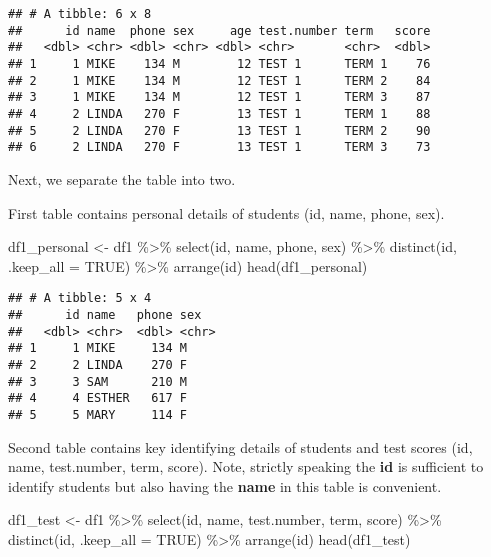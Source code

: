 \documentclass[
]{article}
\newenvironment{Shaded}{\begin{snugshade}}{\end{snugshade}}
\newcommand{\AttributeTok}[1]{\textcolor[rgb]{0.77,0.63,0.00}{#1}}
\newcommand{\ConstantTok}[1]{\textcolor[rgb]{0.00,0.00,0.00}{#1}}
\newcommand{\FunctionTok}[1]{\textcolor[rgb]{0.00,0.00,0.00}{#1}}
\newcommand{\NormalTok}[1]{#1}
\newcommand{\OtherTok}[1]{\textcolor[rgb]{0.56,0.35,0.01}{#1}}
\newcommand{\SpecialCharTok}[1]{\textcolor[rgb]{0.00,0.00,0.00}{#1}}
\begin{document}
\begin{verbatim}
## # A tibble: 6 x 8
##      id name  phone sex     age test.number term   score
##   <dbl> <chr> <dbl> <chr> <dbl> <chr>       <chr>  <dbl>
## 1     1 MIKE    134 M        12 TEST 1      TERM 1    76
## 2     1 MIKE    134 M        12 TEST 1      TERM 2    84
## 3     1 MIKE    134 M        12 TEST 1      TERM 3    87
## 4     2 LINDA   270 F        13 TEST 1      TERM 1    88
## 5     2 LINDA   270 F        13 TEST 1      TERM 2    90
## 6     2 LINDA   270 F        13 TEST 1      TERM 3    73
\end{verbatim}

Next, we separate the table into two.

First table contains personal details of students (id, name, phone,
sex).

\begin{Shaded}
\begin{Highlighting}[]
\NormalTok{df1\_personal }\OtherTok{\textless{}{-}}\NormalTok{ df1 }\SpecialCharTok{\%\textgreater{}\%}
            \FunctionTok{select}\NormalTok{(id, name, phone, sex) }\SpecialCharTok{\%\textgreater{}\%}
            \FunctionTok{distinct}\NormalTok{(id, }\AttributeTok{.keep\_all =} \ConstantTok{TRUE}\NormalTok{) }\SpecialCharTok{\%\textgreater{}\%}
            \FunctionTok{arrange}\NormalTok{(id)}
\FunctionTok{head}\NormalTok{(df1\_personal)}
\end{Highlighting}
\end{Shaded}

\begin{verbatim}
## # A tibble: 5 x 4
##      id name   phone sex  
##   <dbl> <chr>  <dbl> <chr>
## 1     1 MIKE     134 M    
## 2     2 LINDA    270 F    
## 3     3 SAM      210 M    
## 4     4 ESTHER   617 F    
## 5     5 MARY     114 F
\end{verbatim}

Second table contains key identifying details of students and test
scores (id, name, test.number, term, score). Note, strictly speaking the
\textbf{id} is sufficient to identify students but also having the
\textbf{name} in this table is convenient.

\begin{Shaded}
\begin{Highlighting}[]
\NormalTok{df1\_test }\OtherTok{\textless{}{-}}\NormalTok{ df1 }\SpecialCharTok{\%\textgreater{}\%}
            \FunctionTok{select}\NormalTok{(id, name, test.number, term, score) }\SpecialCharTok{\%\textgreater{}\%}
            \FunctionTok{distinct}\NormalTok{(id, }\AttributeTok{.keep\_all =} \ConstantTok{TRUE}\NormalTok{) }\SpecialCharTok{\%\textgreater{}\%}
            \FunctionTok{arrange}\NormalTok{(id)}
\FunctionTok{head}\NormalTok{(df1\_test)}
\end{Highlighting}
\end{Shaded}
\end{document}
